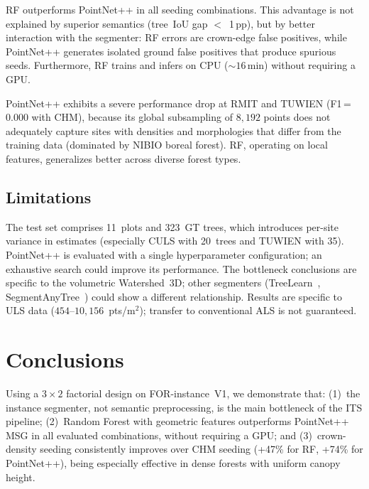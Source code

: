 \documentclass[runningheads]{llncs}
\begin{document}
RF outperforms PointNet++ in all seeding combinations. This advantage is not explained by superior semantics (tree~IoU gap $<$~1\,pp), but by better interaction with the segmenter: RF errors are crown-edge false positives, while PointNet++ generates isolated ground false positives that produce spurious seeds. Furthermore, RF trains and infers on CPU (${\sim}16$\,min) without requiring a GPU.

PointNet++ exhibits a severe performance drop at RMIT and TUWIEN (F1\,=\,0.000 with CHM), because its global subsampling of $8{,}192$ points does not adequately capture sites with densities and morphologies that differ from the training data (dominated by NIBIO boreal forest). RF, operating on local features, generalizes better across diverse forest types.

\subsection{Limitations}

The test set comprises 11~plots and 323~GT trees, which introduces per-site variance in estimates (especially CULS with 20~trees and TUWIEN with 35). PointNet++ is evaluated with a single hyperparameter configuration; an exhaustive search could improve its performance. The bottleneck conclusions are specific to the volumetric Watershed~3D; other segmenters (TreeLearn~\cite{henrich2024}, SegmentAnyTree~\cite{wielgosz2024}) could show a different relationship. Results are specific to ULS data ($454$--$10{,}156$~pts/m$^2$); transfer to conventional ALS is not guaranteed.

\section{Conclusions}\label{sec:conclusions}

Using a $3 \times 2$ factorial design on FOR-instance~V1, we demonstrate that: (1)~the instance segmenter, not semantic preprocessing, is the main bottleneck of the ITS pipeline; (2)~Random Forest with geometric features outperforms PointNet++ MSG in all evaluated combinations, without requiring a GPU; and (3)~crown-density seeding consistently improves over CHM seeding (+47\% for RF, +74\% for PointNet++), being especially effective in dense forests with uniform canopy height.
\end{document}
